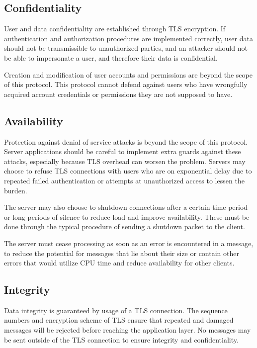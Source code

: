 \subsection{Confidentiality}
\label{sec:security:conf}
User and data confidentiality are established through TLS encryption. If authentication and authorization procedures are implemented correctly, user data should not be transmissible to unauthorized parties, and an attacker should not be able to impersonate a user, and therefore their data is confidential.

Creation and modification of user accounts and permissions are beyond the scope of this protocol. This protocol cannot defend against users who have wrongfully acquired account credentials or permissions they are not supposed to have.

\subsection{Availability}
\label{sec:security:avail}
Protection against denial of service attacks is beyond the scope of this protocol. Server applications should be careful to implement extra guards against these attacks, especially because TLS overhead can worsen the problem. Servers may choose to refuse TLS connections with users who are on exponential delay due to repeated failed authentication or attempts at unauthorized access to lessen the burden.

The server may also choose to shutdown connections after a certain time period or long periods of silence to reduce load and improve availability. These must be done through the typical procedure of sending a shutdown packet to the client.

The server must cease processing as soon as an error is encountered in a message, to reduce the potential for messages that lie about their size or contain other errors that would utilize CPU time and reduce availability for other clients.

\subsection{Integrity}
\label{sec:security:integrity}
Data integrity is guaranteed by usage of a TLS connection. The sequence numbers and encryption scheme of TLS ensure that repeated and damaged messages will be rejected before reaching the application layer. No messages may be sent outside of the TLS connection to ensure integrity and confidentiality.

